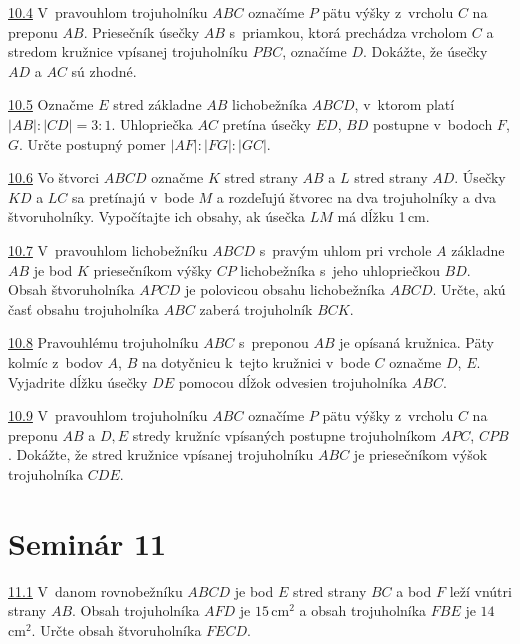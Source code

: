 \noindent \ul{10.4} 
 V~pravouhlom trojuholníku $ABC$ označíme $P$ pätu výšky z~vrcholu $C$ na preponu $AB$. Priesečník úsečky $AB$ s~priamkou, ktorá prechádza vrcholom $C$ a stredom kružnice vpísanej trojuholníku $PBC$, označíme $D$. Dokážte, že úsečky $AD$ a $AC$ sú zhodné.




\noindent \ul{10.5}  Označme $E$ stred základne $AB$ lichobežníka $ABCD$, v~ktorom platí $|AB| : |CD| = 3 : 1$. Uhlopriečka $AC$ pretína úsečky $ED$, $BD$ postupne v~bodoch $F$, $G$. Určte postupný pomer $|AF| : |FG| : |GC|$.




\noindent \ul{10.6}  Vo štvorci $ABCD$ označme $K$ stred strany $AB$ a $L$ stred strany $AD$. Úsečky $KD$ a $LC$ sa pretínajú v~bode $M$ a rozdeľujú štvorec na dva trojuholníky a dva štvoruholníky. Vypočítajte ich obsahy, ak úsečka $LM$ má dĺžku 1\,cm.




\noindent \ul{10.7}  V~pravouhlom lichobežníku $ABCD$ s~pravým uhlom pri vrchole $A$ základne $AB$ je bod $K$ priesečníkom výšky $CP$ lichobežníka s~jeho uhlopriečkou $BD$. Obsah štvoruholníka $APCD$ je polovicou obsahu lichobežníka $ABCD$. Určte, akú časť obsahu trojuholníka $ABC$ zaberá trojuholník $BCK$.




\noindent \ul{10.8}  Pravouhlému trojuholníku $ABC$ s~preponou $AB$ je opísaná kružnica. Päty kolmíc z~bodov $A$, $B$ na dotyčnicu k~tejto kružnici v~bode $C$ označme $D$, $E$. Vyjadrite dĺžku úsečky $DE$ pomocou dĺžok odvesien trojuholníka $ABC$.




\noindent \ul{10.9} 
V~pravouhlom trojuholníku $ABC$ označíme $P$ pätu výšky z~vrcholu $C$ na preponu $AB$ a $D, E$ stredy kružníc vpísaných postupne trojuholníkom $APC$, $CPB$. Dokážte, že stred
kružnice vpísanej trojuholníku $ABC$ je priesečníkom výšok trojuholníka $CDE$.




\section*{Seminár 11}

\noindent \ul{11.1}  V~danom rovnobežníku $ABCD$ je bod $E$ stred strany $BC$ a bod $F$ leží vnútri strany $AB$. Obsah trojuholníka $AFD$ je $15$\,cm$^2$ a obsah trojuholníka $FBE$ je $14$\,cm$^2$. Určte obsah štvoruholníka $FECD$.





